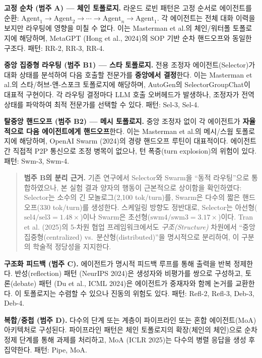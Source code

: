 \documentclass[a4paper,11pt]{article}
\begin{document}
\textbf{고정 순차 (범주 A) --- 체인 토폴로지.} 라운드 로빈 패턴은 고정 순서로 에이전트를 순환: $\text{Agent}_1 \to \text{Agent}_2 \to \cdots \to \text{Agent}_n \to \text{Agent}_1$. 각 에이전트는 전체 대화 이력을 보지만 라우팅에 영향을 미칠 수 없다. 이는 Masterman et al.의 체인/워터폴 토폴로지에 해당하며, MetaGPT (Hong et al., 2024)의 SOP 기반 순차 핸드오프와 동일한 구조다. 패턴: RR-2, RR-3, RR-4.

\textbf{중앙 집중형 라우팅 (범주 B1) --- 스타 토폴로지.} 전용 조정자 에이전트(Selector)가 대화 상태를 분석하여 다음 호출할 전문가를 \textbf{중앙에서 결정}한다. 이는 Masterman et al.의 스타/허브-앤-스포크 토폴로지에 해당하며, AutoGen의 SelectorGroupChat이 대표적 구현이다. 각 라우팅 결정마다 LLM 호출 오버헤드가 발생하나, 조정자가 전역 상태를 파악하여 최적 전문가를 선택할 수 있다. 패턴: Sel-3, Sel-4.

\textbf{탈중앙 핸드오프 (범주 B2) --- 메시 토폴로지.} 중앙 조정자 없이 각 에이전트가 \textbf{자율적으로 다음 에이전트에게 핸드오프}한다. 이는 Masterman et al.의 메시/스웜 토폴로지에 해당하며, OpenAI Swarm (2024)의 경량 핸드오프 루틴이 대표적이다. 에이전트 간 직접적 P2P 통신으로 조정 병목이 없으나, 턴 폭증(turn explosion)의 위험이 있다. 패턴: Swm-3, Swm-4.

\begin{quote}
\textbf{범주 B의 분리 근거.} 기존 연구에서 Selector와 Swarm을 ``동적 라우팅''으로 통합하였으나, 본 실험 결과 양자의 행동이 근본적으로 상이함을 확인하였다: Selector는 소수의 긴 모놀로그(2,100 tok/turn)를, Swarm은 다수의 짧은 핸드오프(330 tok/turn)를 생성한다. 스케일링 방향도 정반대로, Selector는 아선형($\text{sel4}/\text{sel3}=1.48\times$)이나 Swarm은 초선형($\text{swm4}/\text{swm3}=3.17\times$)이다. Tran et al. (2025)의 5-차원 협업 프레임워크에서도 \emph{구조(Structure)} 차원에서 ``중앙 집중형(centralized) vs.\ 분산형(distributed)''을 명시적으로 분리하여, 이 구분의 학술적 정당성을 지지한다.
\end{quote}

\textbf{구조화 피드백 (범주 C).} 에이전트가 명시적 피드백 루프를 통해 출력을 반복 정제한다. 반성(reflection) 패턴 (NeurIPS 2024)은 생성자와 비평가를 쌍으로 구성하고, 토론(debate) 패턴 (Du et al., ICML 2024)은 에이전트가 중재자와 함께 논거를 교환한다. 이 토폴로지는 수렴할 수 있으나 진동의 위험도 있다. 패턴: Refl-2, Refl-3, Deb-3, Deb-4.

\textbf{복합/중첩 (범주 D).} 다수의 단계 또는 계층이 파이프라인 또는 혼합 에이전트(MoA) 아키텍처로 구성된다. 파이프라인 패턴은 체인 토폴로지의 확장(체인의 체인)으로 순차 정제 단계를 통해 과제를 처리하고, MoA (ICLR 2025)는 다수의 병렬 응답을 생성 후 집약한다. 패턴: Pipe, MoA.
\end{document}
